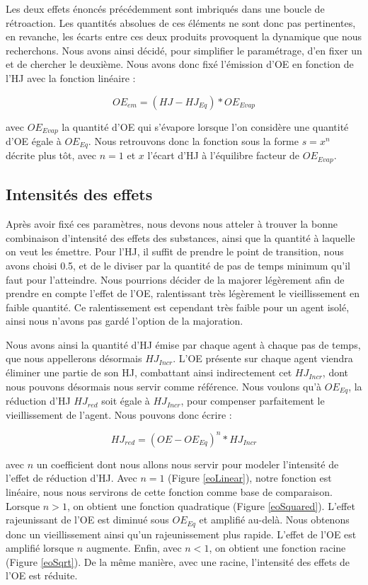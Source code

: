 	Les deux effets énoncés précédemment sont imbriqués dans une boucle de rétroaction. Les quantités absolues de ces éléments ne sont donc pas pertinentes, en revanche, les écarts entre ces deux produits provoquent la dynamique que nous recherchons. Nous avons ainsi décidé, pour simplifier le paramétrage, d'en fixer un et de chercher le deuxième. Nous avons donc fixé l'émission d'OE en fonction de l'HJ avec la fonction linéaire :
	
	\begin{equation}
		OE_{em} = (HJ - HJ_{Eq}) * OE_{Evap}
	\label{eoEM}
	\end{equation}

avec $OE_{Evap}$ la quantité d'OE qui s'évapore lorsque l'on considère une quantité d'OE égale à $OE_{Eq}$. Nous retrouvons donc la fonction sous la forme $s=x^n$ décrite plus tôt, avec $n = 1$ et $x$ l'écart d'HJ à l'équilibre facteur de $OE_{Evap}$.
	
	
	\subsection{Intensités des effets}	
	Après avoir fixé ces paramètres, nous devons nous atteler à trouver la bonne combinaison d'intensité des effets des substances, ainsi que la quantité à laquelle on veut les émettre. Pour l'HJ, il suffit de prendre le point de transition, nous avons choisi 0.5, et de le diviser par la quantité de pas de temps minimum qu'il faut pour l'atteindre. Nous pourrions décider de la majorer légèrement afin de prendre en compte l'effet de l'OE, ralentissant très légèrement le vieillissement en faible quantité. Ce ralentissement est cependant très faible pour un agent isolé, ainsi nous n'avons pas gardé l'option de la majoration.
	
	Nous avons ainsi la quantité d'HJ émise par chaque agent à chaque pas de temps, que nous appellerons désormais $HJ_{Incr}$. L'OE présente sur chaque agent viendra éliminer une partie de son HJ, combattant ainsi indirectement cet $HJ_{Incr}$, dont nous pouvons désormais nous servir comme référence. Nous voulons qu'à $OE_{Eq}$, la réduction d'HJ $HJ_{red}$ soit égale à $HJ_{Incr}$, pour compenser parfaitement le vieillissement de l'agent. Nous pouvons donc écrire :
	
	\begin{equation}
		 HJ_{red} = (OE - OE_{Eq})^n * HJ_{Incr}
	\label{hjRED}
	\end{equation}
	
	avec $n$ un coefficient dont nous allons nous servir pour modeler l'intensité de l'effet de réduction d'HJ. Avec $n=1$ (Figure \ref{eoLinear}), notre fonction est linéaire, nous nous servirons de cette fonction comme base de comparaison. Lorsque $n>1$, on obtient une fonction quadratique (Figure \ref{eoSquared}). L'effet rajeunissant de l'OE est diminué sous $OE_{Eq}$ et amplifié au-delà. Nous obtenons donc un vieillissement ainsi qu'un rajeunissement plus rapide. L'effet de l'OE est amplifié lorsque $n$ augmente. Enfin, avec $n < 1$, on obtient une fonction racine (Figure \ref{eoSqrt}). De la même manière, avec une racine, l'intensité des effets de l'OE est réduite.
	
